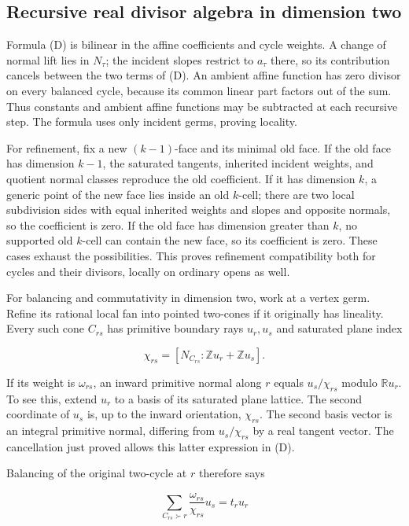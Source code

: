\documentclass[
  10pt,
]{article}
\begin{document}
\subsection{Recursive real divisor algebra in dimension
two}\label{recursive-real-divisor-algebra-in-dimension-two}

Formula (D) is bilinear in the affine coefficients and cycle weights. A
change of normal lift lies in \(N_\tau\); the incident slopes restrict
to \(a_\tau\) there, so its contribution cancels between the two terms
of (D). An ambient affine function has zero divisor on every balanced
cycle, because its common linear part factors out of the sum. Thus
constants and ambient affine functions may be subtracted at each
recursive step. The formula uses only incident germs, proving locality.

For refinement, fix a new \((k-1)\)-face and its minimal old face. If
the old face has dimension \(k-1\), the saturated tangents, inherited
incident weights, and quotient normal classes reproduce the old
coefficient. If it has dimension \(k\), a generic point of the new face
lies inside an old \(k\)-cell; there are two local subdivision sides
with equal inherited weights and slopes and opposite normals, so the
coefficient is zero. If the old face has dimension greater than \(k\),
no supported old \(k\)-cell can contain the new face, so its coefficient
is zero. These cases exhaust the possibilities. This proves refinement
compatibility both for cycles and their divisors, locally on ordinary
opens as well.

For balancing and commutativity in dimension two, work at a vertex germ.
Refine its rational local fan into pointed two-cones if it originally
has lineality. Every such cone \(C_{rs}\) has primitive boundary rays
\(u_r,u_s\) and saturated plane index

\[
\chi_{rs}=[N_{C_{rs}}:\mathbb Z u_r+\mathbb Z u_s].
\]

If its weight is \(\omega_{rs}\), an inward primitive normal along \(r\)
equals \(u_s/\chi_{rs}\) modulo \(\mathbb R u_r\). To see this, extend
\(u_r\) to a basis of its saturated plane lattice. The second coordinate
of \(u_s\) is, up to the inward orientation, \(\chi_{rs}\). The second
basis vector is an integral primitive normal, differing from
\(u_s/\chi_{rs}\) by a real tangent vector. The cancellation just proved
allows this latter expression in (D).

Balancing of the original two-cycle at \(r\) therefore says

\[
\sum_{C_{rs}\succ r}\frac{\omega_{rs}}{\chi_{rs}}u_s=t_r u_r
\]
\end{document}
